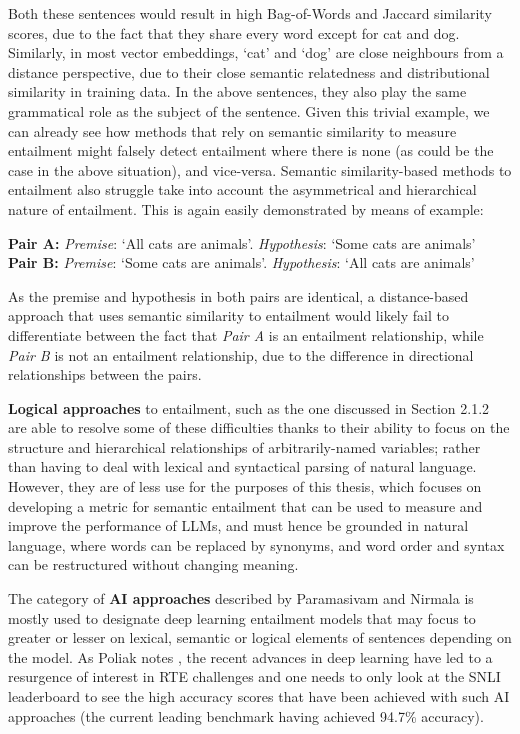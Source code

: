 \documentclass[12pt,twoside]{report}
\begin{document}
Both these sentences would result in high Bag-of-Words and Jaccard similarity scores, due to the fact that they share every word except for cat and dog. Similarly, in most vector embeddings, `cat' and `dog' are close neighbours from a distance perspective, due to their close semantic relatedness and distributional similarity in training data. In the above sentences, they also play the same grammatical role as the subject of the sentence. Given this trivial example, we can already see how methods that rely on semantic similarity to measure entailment might falsely detect entailment where there is none (as could be the case in the above situation), and vice-versa. Semantic similarity-based methods to entailment  also struggle take into account the asymmetrical and hierarchical nature of entailment. This is again easily demonstrated by means of example:
\begin{flushleft}
    \textbf{Pair A:} \textit{Premise}: `All cats are animals'. \textit{Hypothesis}: `Some cats are animals' \\
    \textbf{Pair B:} \textit{Premise}: `Some cats are animals'. \textit{Hypothesis}: `All cats are animals'
\end{flushleft}

As the premise and hypothesis in both pairs are identical, a distance-based approach that uses semantic similarity to entailment would likely fail to differentiate between the fact that \textit{Pair A} is an entailment relationship, while \textit{Pair B} is not an entailment relationship, due to the difference in directional relationships between the pairs. \newline \par

\textbf{Logical approaches} to entailment, such as the one discussed in Section 2.1.2 are able to resolve some of these difficulties thanks to their ability to focus on the structure and hierarchical relationships of arbitrarily-named variables; rather than having to deal with lexical and syntactical parsing of natural language. However, they are of less use for the purposes of this thesis, which focuses on developing a metric for semantic entailment that can be used to measure and improve the performance of LLMs, and must hence be grounded in natural language, where words can be replaced by synonyms, and word order and syntax can be restructured without changing meaning. \newline \par

The category of \textbf{AI approaches} described by Paramasivam and Nirmala \cite{PARAMASIVAM20229644} is mostly used to designate deep learning entailment models that may focus to greater or lesser on lexical, semantic or logical elements of sentences depending on the model. As Poliak notes \cite{poliak-2020-survey}, the recent advances in deep learning have led to a resurgence of interest in RTE challenges and one needs to only look at the SNLI leaderboard to see the high accuracy scores that have been achieved with such AI approaches (the current leading benchmark having achieved 94.7\% accuracy). \newline \par
\end{document}
